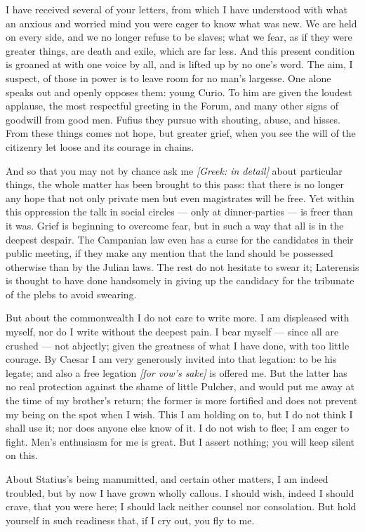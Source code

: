 

 I have received several of your letters, from which I have understood with what an anxious and worried mind you were eager to know what was new. We are held on every side, and we no longer refuse to be slaves; what we fear, as if they were greater things, are death and exile, which are far less. And this present condition is groaned at with one voice by all, and is lifted up by no one's word. The aim, I suspect, of those in power is to leave room for no man's largesse. One alone speaks out and openly opposes them: young Curio. To him are given the loudest applause, the most respectful greeting in the Forum, and many other signs of goodwill from good men. Fufius they pursue with shouting, abuse, and hisses. From these things comes not hope, but greater grief, when you see the will of the citizenry let loose and its courage in chains.

 And so that you may not by chance ask me \textit{[Greek: in detail]} about particular things, the whole matter has been brought to this pass: that there is no longer any hope that not only private men but even magistrates will be free. Yet within this oppression the talk in social circles --- only at dinner-parties --- is freer than it was. Grief is beginning to overcome fear, but in such a way that all is in the deepest despair. The Campanian law even has a curse for the candidates in their public meeting, if they make any mention that the land should be possessed otherwise than by the Julian laws. The rest do not hesitate to swear it; Laterensis is thought to have done handsomely in giving up the candidacy for the tribunate of the plebs to avoid swearing.

 But about the commonwealth I do not care to write more. I am displeased with myself, nor do I write without the deepest pain. I bear myself --- since all are crushed --- not abjectly; given the greatness of what I have done, with too little courage. By Caesar I am very generously invited into that legation: to be his legate; and also a free legation \textit{[for vow's sake]} is offered me. But the latter has no real protection against the shame of little Pulcher, and would put me away at the time of my brother's return; the former is more fortified and does not prevent my being on the spot when I wish. This I am holding on to, but I do not think I shall use it; nor does anyone else know of it. I do not wish to flee; I am eager to fight. Men's enthusiasm for me is great. But I assert nothing; you will keep silent on this.

 About Statius's being manumitted, and certain other matters, I am indeed troubled, but by now I have grown wholly callous. I should wish, indeed I should crave, that you were here; I should lack neither counsel nor consolation. But hold yourself in such readiness that, if I cry out, you fly to me.
